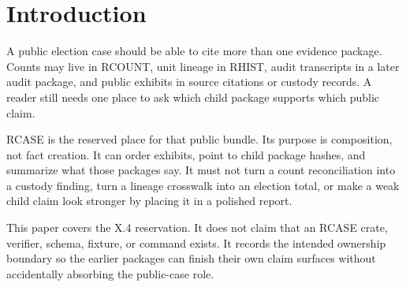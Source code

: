 \section{Introduction}

A public election case should be able to cite more than one evidence package.
Counts may live in RCOUNT, unit lineage in RHIST, audit transcripts in a later
audit package, and public exhibits in source citations or custody records. A
reader still needs one place to ask which child package supports which public
claim.

RCASE is the reserved place for that public bundle. Its purpose is composition,
not fact creation. It can order exhibits, point to child package hashes, and
summarize what those packages say. It must not turn a count reconciliation into
a custody finding, turn a lineage crosswalk into an election total, or make a
weak child claim look stronger by placing it in a polished report.

This paper covers the X.4 reservation. It does not claim that an RCASE crate,
verifier, schema, fixture, or command exists. It records the intended ownership
boundary so the earlier packages can finish their own claim surfaces without
accidentally absorbing the public-case role.
